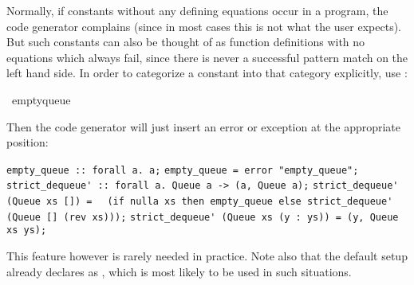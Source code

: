 \begin{isabellebody}
\begin{isamarkuptext}
  Normally, if constants without any defining equations occur in
  a program, the code generator complains (since in most cases
  this is not what the user expects).  But such constants can also
  be thought of as function definitions with no equations which
  always fail, since there is never a successful pattern match
  on the left hand side.  In order to categorize a constant into
  that category explicitly, use \hyperlink{command.code-abort}{\mbox{}}:%
\end{isamarkuptext}%
\isamarkuptrue%
%
\isadelimquoteme
%
\endisadelimquoteme
%
\isatagquoteme
{}\isamarkupfalse%
\ empty{\isacharunderscore}queue%
\endisatagquoteme
{\isafoldquoteme}%
%
\isadelimquoteme
%
\endisadelimquoteme
%
\begin{isamarkuptext}%
\noindent Then the code generator will just insert an error or
  exception at the appropriate position:%
\end{isamarkuptext}%
\isamarkuptrue%
%
\isadelimquoteme
%
\endisadelimquoteme
%
\isatagquoteme
%
\begin{isamarkuptext}%
\isaverbatim%
\noindent%
\verb|empty_queue :: forall a. a;|\newline%
\verb|empty_queue = error "empty_queue";|\newline%
\newline%
\verb|strict_dequeue' :: forall a. Queue a -> (a, Queue a);|\newline%
\verb|strict_dequeue' (Queue xs []) =|\newline%
\verb|  (if nulla xs then empty_queue else strict_dequeue' (Queue [] (rev xs)));|\newline%
\verb|strict_dequeue' (Queue xs (y : ys)) = (y, Queue xs ys);|%
\end{isamarkuptext}%
\isamarkuptrue%
%
\endisatagquoteme
{\isafoldquoteme}%
%
\isadelimquoteme
%
\endisadelimquoteme
%
\begin{isamarkuptext}%
\noindent This feature however is rarely needed in practice.
  Note also that the  default setup already declares
   as \hyperlink{command.code-abort}{\mbox{}}, which is most
  likely to be used in such situations.%
\end{isamarkuptext}%
\isamarkuptrue%
%
\isadelimtheory
%
\endisadelimtheory
%
\isatagtheory
{}\isamarkupfalse%
%
\endisatagtheory
{\isafoldtheory}%
%
\isadelimtheory
%
\endisadelimtheory
\isanewline
\ \end{isabellebody}%
